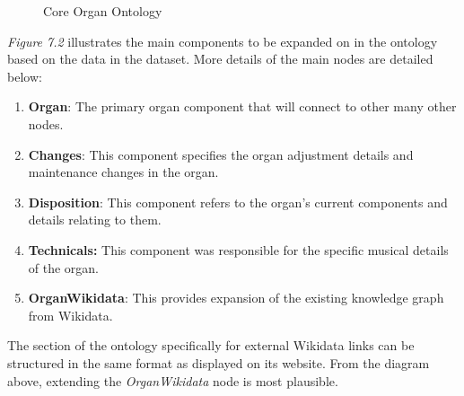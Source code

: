 \begin{figure}[H]
    \begin{center}
    \end{center}
    \vspace{-0.4cm}
\caption{Core Organ Ontology}
\end{figure}
\vspace{-0.1cm}

\textit{Figure 7.2} illustrates the main components to be expanded on in the ontology based on the data in the dataset. More details of the main nodes are detailed below:

\begin{enumerate}
    \item \textbf{Organ}: The primary organ component that will connect to other many other nodes.
    \item \textbf{Changes}: This component specifies the organ adjustment details and maintenance changes in the organ.
    \item \textbf{Disposition}: This component refers to the organ's current components and details relating to them.
    \item \textbf{Technicals:} This component was responsible for the specific musical details of the organ. 
    \item \textbf{OrganWikidata}: This provides expansion of the existing knowledge graph from Wikidata.
\end{enumerate}

The section of the ontology specifically for external Wikidata links can be structured in the same format as displayed on its website. From the diagram above, extending the \textit{OrganWikidata} node is most plausible.

